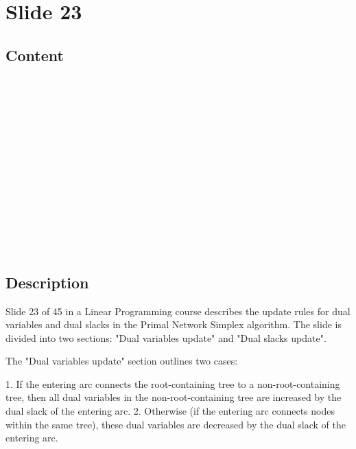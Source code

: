 \documentclass{article}%
\begin{document}
%
\newpage%
\section{Slide 23}%
\label{sec:Slide23}%
\subsection{Content}%

\underline{} \\
\underline{} \\
 \\
\bullet {} \\
 \\
 \\
 \\
\bullet {} \\
 \\
\bullet {} \\
 \\
 \\
 \\
%
\subsection{Description}%
Slide 23 of 45 in a Linear Programming course describes the update rules for dual variables and dual slacks in the Primal Network Simplex algorithm.  The slide is divided into two sections: "Dual variables update" and "Dual slacks update".

The "Dual variables update" section outlines two cases:

1. If the entering arc connects the root-containing tree to a non-root-containing tree, then all dual variables in the non-root-containing tree are increased by the dual slack of the entering arc.
2. Otherwise (if the entering arc connects nodes within the same tree), these dual variables are decreased by the dual slack of the entering arc.
\end{document}

